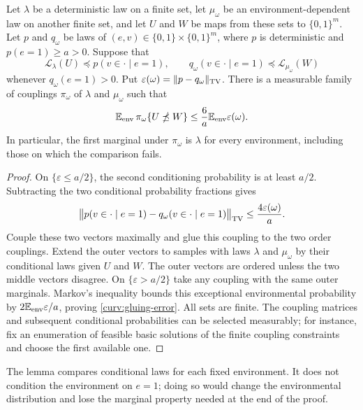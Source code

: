 \begin{lemma}
\label{curv:conditional-gluing}
Let $\lambda$ be a deterministic law on a finite set, let $\mu_\omega$
be an environment-dependent law on another finite set, and let
$U$ and $W$ be maps from these sets to $\{0,1\}^m$.
Let $p$ and $q_\omega$ be laws of $(e,v)\in\{0,1\}\times\{0,1\}^m$,
where $p$ is deterministic and $p(e=1)\ge a>0$.  Suppose that
\[
 \mathcal L_\lambda(U)\preceq p(v\in\cdot\mid e=1),\qquad
 q_\omega(v\in\cdot\mid e=1)\preceq\mathcal L_{\mu_\omega}(W)
\]
whenever $q_\omega(e=1)>0$.  Put
$\varepsilon(\omega)=\|p-q_\omega\|_{\operatorname{TV}}$.  There is a measurable
family of couplings $\pi_\omega$ of $\lambda$ and $\mu_\omega$ such that
\begin{equation}
 \mathbb E_{\mathrm{env}}\,
 \pi_\omega\{U\npreceq W\}
 \le \frac{6}{a}\mathbb E_{\mathrm{env}}\varepsilon(\omega).
 \label{curv:gluing-error}
\end{equation}
In particular, the first marginal under $\pi_\omega$ is $\lambda$ for
every environment, including those on which the comparison fails.
\end{lemma}

\begin{proof}
On $\{\varepsilon\le a/2\}$, the second conditioning probability is at
least $a/2$.  Subtracting the two conditional probability fractions gives
\[
 \bigl\|p(v\in\cdot\mid e=1)
       -q_\omega(v\in\cdot\mid e=1)\bigr\|_{\operatorname{TV}}
 \le \frac{4\varepsilon(\omega)}a.
\]
Couple these two vectors maximally and glue this coupling to the two
order couplings.  Extend the outer vectors to samples with laws
$\lambda$ and $\mu_\omega$ by their conditional laws given $U$ and $W$.
The outer vectors are ordered unless the two middle vectors disagree.
On $\{\varepsilon>a/2\}$ take any coupling with the same outer
marginals.  Markov's inequality bounds this exceptional environmental
probability by $2\mathbb E_{\mathrm{env}}\varepsilon/a$, proving
\eqref{curv:gluing-error}.  All sets are finite.  The coupling matrices
and subsequent conditional probabilities can be selected measurably;
for instance, fix an enumeration of feasible basic solutions of the
finite coupling constraints and choose the first available one.
\end{proof}

The lemma compares conditional laws for each fixed environment.  It
does not condition the environment on $e=1$; doing so would change the
environmental distribution and lose the marginal property needed at
the end of the proof.

